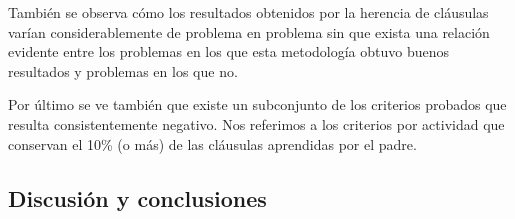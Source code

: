 También se observa cómo los resultados obtenidos por la herencia de cláusulas
varían considerablemente de problema en problema sin que exista una relación
evidente entre los problemas en los que esta metodología obtuvo buenos
resultados y problemas en los que no.

Por último se ve también que existe un subconjunto de los criterios probados
que resulta consistentemente negativo. Nos referimos a los criterios por
actividad que conservan el 10\% (o más) de las cláusulas aprendidas por el
padre.

\subsection{Discusión y conclusiones}

